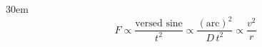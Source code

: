 \documentclass[border=4pt]{standalone}
\begin{document}
\begin{varwidth}{30em}
\large
\[ F \propto \dfrac{\text{versed sine}}{t^2} \propto \dfrac{(\text{arc})^2}{D\,t^2} \propto \dfrac{v^2}{r} \]

\end{varwidth}
\end{document}
